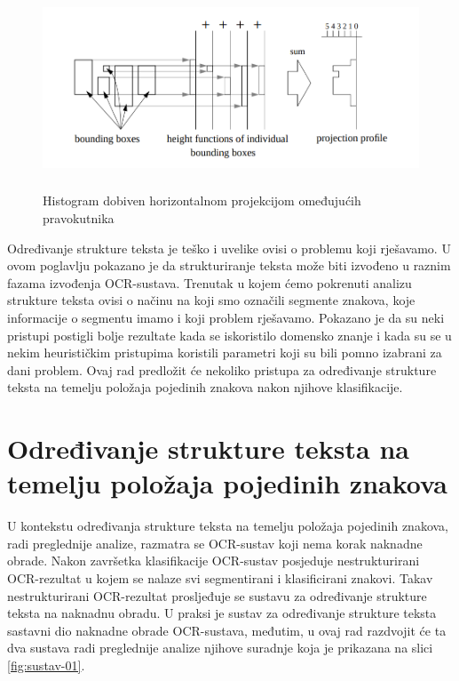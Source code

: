 \documentclass[times, utf8, zavrsni]{fer}
\begin{document}
\begin{figure}[htb]
    \centering
    \captionsetup{justification=centering,margin=2cm}
    \includegraphics[height=6cm]{images/histogram-projection.png}
    \caption{Histogram dobiven horizontalnom projekcijom omeđujućih pravokutnika \citep{liang1996document}}
    \label{fig:histogram-projection}
\end{figure}

Određivanje strukture teksta je teško i uvelike ovisi o problemu koji
rješavamo. U ovom poglavlju pokazano je da strukturiranje teksta može biti
izvođeno u raznim fazama izvođenja OCR-sustava. Trenutak u kojem ćemo pokrenuti
analizu strukture teksta ovisi o načinu na koji smo označili segmente znakova,
koje informacije o segmentu imamo i koji problem rješavamo. Pokazano je da su
neki pristupi postigli bolje rezultate kada se iskoristilo domensko znanje i
kada su se u nekim heurističkim pristupima koristili parametri koji su bili
pomno izabrani za dani problem. Ovaj rad predložit će nekoliko pristupa za
određivanje strukture teksta na temelju položaja pojedinih znakova nakon
njihove klasifikacije.
















\chapter{Određivanje strukture teksta na temelju položaja pojedinih znakova}
U kontekstu određivanja strukture teksta na temelju položaja pojedinih znakova,
radi preglednije analize, razmatra se OCR-sustav koji nema
korak naknadne obrade. Nakon završetka klasifikacije OCR-sustav posjeduje
nestrukturirani OCR-rezultat u kojem se nalaze svi segmentirani i
klasificirani znakovi. Takav nestrukturirani OCR-rezultat prosljeđuje se
sustavu za određivanje strukture teksta na naknadnu obradu. U praksi je sustav
za određivanje strukture teksta sastavni dio naknadne obrade OCR-sustava,
međutim, u ovaj rad razdvojit će ta dva sustava radi preglednije analize
njihove suradnje koja je prikazana na slici \ref{fig:sustav-01}.
\end{document}
